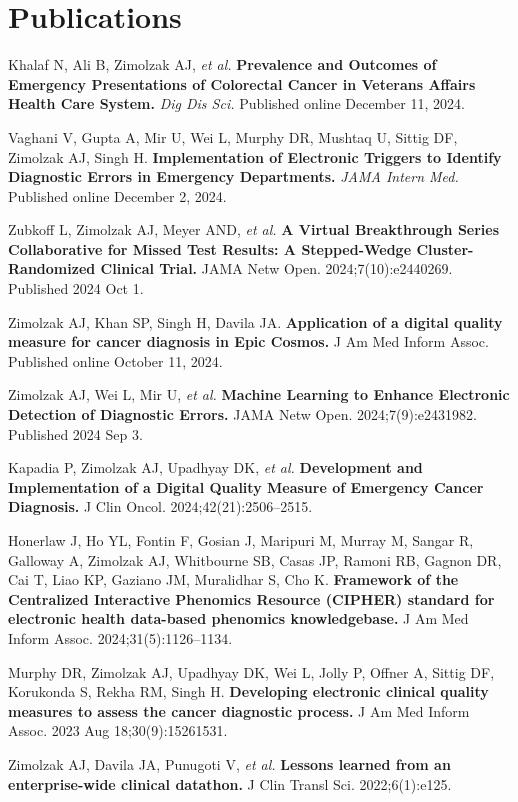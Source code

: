 \documentclass[10pt]{article}
\begin{document}
\section*{Publications}


Khalaf N, Ali B, Zimolzak AJ, \emph{et al.} \textbf{Prevalence and
  Outcomes of Emergency Presentations of Colorectal Cancer in Veterans
  Affairs Health Care System.} \emph{Dig Dis Sci.} Published online
December 11, 2024.

Vaghani V, Gupta A, Mir U, Wei L, Murphy DR, Mushtaq U, Sittig DF,
Zimolzak AJ, Singh H. \textbf{Implementation of Electronic Triggers to
  Identify Diagnostic Errors in Emergency Departments.} \emph{JAMA
Intern Med.} Published online December 2, 2024.

Zubkoff L, Zimolzak AJ, Meyer AND, \emph{et al.} \textbf{A Virtual
  Breakthrough Series Collaborative for Missed Test Results: A
  Stepped-Wedge Cluster-Randomized Clinical Trial.} JAMA Netw Open.
2024;7(10):e2440269. Published 2024 Oct 1.

Zimolzak AJ, Khan SP, Singh H, Davila JA. \textbf{Application of a
  digital quality measure for cancer diagnosis in Epic Cosmos.} J Am
Med Inform Assoc. Published online October 11, 2024.

Zimolzak AJ, Wei L, Mir U, \emph{et al.} \textbf{Machine Learning to
  Enhance Electronic Detection of Diagnostic Errors.} JAMA Netw Open.
2024;7(9):e2431982. Published 2024 Sep 3.

Kapadia P, Zimolzak AJ, Upadhyay DK, \emph{et al.} \textbf{Development
  and Implementation of a Digital Quality Measure of Emergency Cancer
  Diagnosis.} J Clin Oncol. 2024;42(21):2506--2515.

Honerlaw J, Ho YL, Fontin F, Gosian J, Maripuri M, Murray M, Sangar R,
Galloway A, Zimolzak AJ, Whitbourne SB, Casas JP, Ramoni RB, Gagnon
DR, Cai T, Liao KP, Gaziano JM, Muralidhar S, Cho K. \textbf{Framework
  of the Centralized Interactive Phenomics Resource (CIPHER) standard
  for electronic health data-based phenomics knowledgebase.} J Am Med
Inform Assoc. 2024;31(5):1126--1134.

Murphy DR, Zimolzak AJ, Upadhyay DK, Wei L, Jolly P, Offner A, Sittig
DF, Korukonda S, Rekha RM, Singh H. \textbf{Developing electronic
  clinical quality measures to assess the cancer diagnostic process.}
J Am Med Inform Assoc. 2023 Aug 18;30(9):1526\ndash{}1531.

Zimolzak AJ, Davila JA, Punugoti V, \emph{et al.} \textbf{Lessons
  learned from an enterprise-wide clinical datathon.} J Clin Transl
Sci. 2022;6(1):e125.
\end{document}
